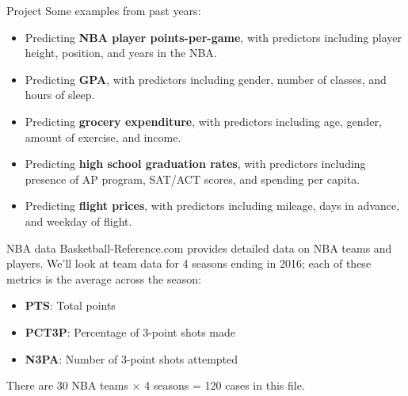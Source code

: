 \documentclass{beamer}\usepackage[]{graphicx}\usepackage[]{color}
\begin{document}
\begin{darkframes}
    \begin{frame}{Project}
      Some examples from past years:
      \begin{itemize}
      \item Predicting \textbf{NBA player points-per-game}, with predictors including
        player height, position, and years in the NBA.
      \item  Predicting \textbf{GPA}, with predictors including gender, number of classes, and hours of sleep.
      \item Predicting \textbf{grocery expenditure}, with predictors including  age, gender, amount of exercise, and income.
      \item  Predicting \textbf{high school graduation rates}, with predictors including presence of AP program, SAT/ACT scores, and
        spending per capita.
      \item Predicting \textbf{flight prices}, with predictors including mileage, days in advance, and
        weekday of flight.
      \end{itemize}
    \end{frame}


    \begin{frame}{NBA data}
      Basketball-Reference.com provides detailed data on NBA teams and players. We'll look at team data for 4 seasons ending in 2016; each of these metrics is the average across the season:
      \begin{itemize}
        \item \textbf{PTS}: Total points
        \item \textbf{PCT3P}: Percentage of 3-point shots made
        \item \textbf{N3PA}: Number of 3-point shots attempted
      \end{itemize}
      There are 30 NBA teams $\times$ 4 seasons = 120 cases in this file.
    \end{frame}


\end{darkframes}
\end{document}
